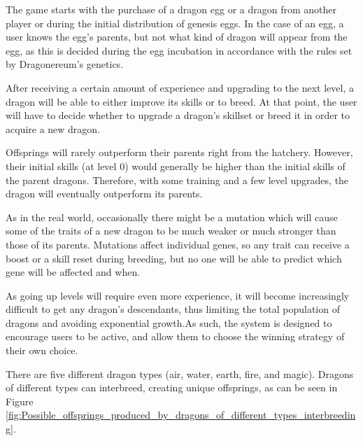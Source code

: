 \documentclass[12pt]{article}
\begin{document}
The game starts with the purchase of a dragon egg or a dragon from another player or during the initial distribution of genesis eggs. In the case of an egg, a user knows the egg’s parents, but not what kind of dragon will appear from the egg, as this is decided during the egg incubation in accordance with the rules set by Dragonereum’s genetics.\par

After receiving a certain amount of experience and upgrading to the next level, a dragon will be able to either improve its skills or to breed. At that point, the user will have to decide whether to upgrade a dragon’s skillset or breed it in order to acquire a new dragon.\par

Offsprings will rarely outperform their parents right from the hatchery. However, their initial skills (at level 0) would generally be higher than the initial skills of the parent dragons. Therefore, with some training and a few level upgrades, the dragon will eventually outperform its parents.\par

As in the real world, occasionally there might be a mutation which will cause some of the traits of a new dragon to be much weaker or much stronger than those of its parents. Mutations affect individual genes, so any trait can receive a boost or a skill reset during breeding, but no one will be able to predict which gene will be affected and when.\par

As going up levels will require even more experience, it will become increasingly difficult to get any dragon’s descendants, thus limiting the total population of dragons and avoiding exponential growth.As such, the system is designed to encourage users to be active, and allow them to choose the winning strategy of their own choice.\par

There are five different dragon types (air, water, earth, fire, and magic). Dragons of different types can interbreed, creating unique offsprings, as can be seen in Figure \ref{fig:Possible_offsprings_produced_by_dragons_of_different_types_interbreeding}.\par
\end{document}
